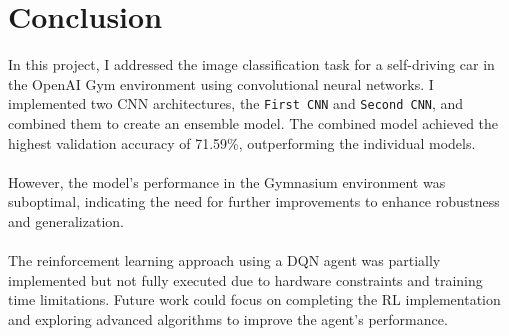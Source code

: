 \documentclass{article}
\begin{document}
\section{Conclusion}

In this project, I addressed the image classification task for a self-driving car in the OpenAI Gym environment using convolutional neural networks. I implemented two CNN architectures, the \texttt{First CNN} and \texttt{Second CNN}, and combined them to create an ensemble model. The combined model achieved the highest validation accuracy of 71.59\%, outperforming the individual models. 
\\\\
However, the model's performance in the Gymnasium environment was suboptimal, indicating the need for further improvements to enhance robustness and generalization. 
\\\\
The reinforcement learning approach using a DQN agent was partially implemented but not fully executed due to hardware constraints and training time limitations. Future work could focus on completing the RL implementation and exploring advanced algorithms to improve the agent's performance.
\end{document}
